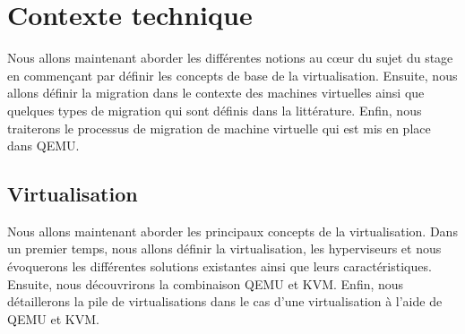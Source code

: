 \newpage
\section{Contexte technique}
Nous allons maintenant aborder les différentes notions au cœur du sujet du stage en commençant par définir les concepts de base de la virtualisation. 
Ensuite, nous allons définir la migration dans le contexte des machines virtuelles ainsi que quelques types de migration qui sont définis dans la littérature.
Enfin, nous traiterons le processus de migration de machine virtuelle qui est mis en place dans QEMU.

\subsection{Virtualisation}
Nous allons maintenant aborder les principaux concepts de la virtualisation.
Dans un premier temps, nous allons définir la virtualisation, les hyperviseurs et nous évoquerons les différentes solutions existantes ainsi que leurs caractéristiques.
Ensuite, nous découvrirons la combinaison QEMU et KVM.
Enfin, nous détaillerons la pile de virtualisations dans le cas d'une virtualisation à l'aide de QEMU et KVM.

